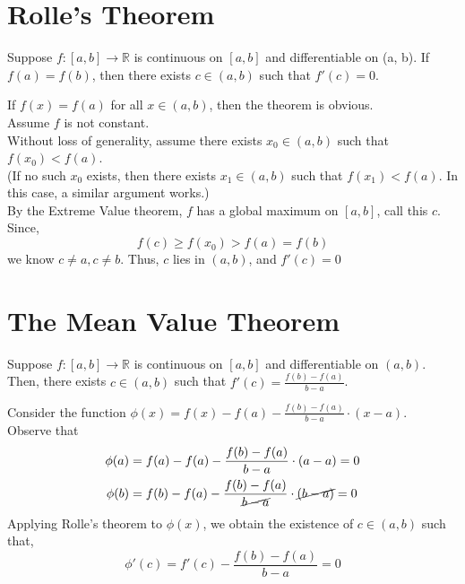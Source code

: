 \documentclass[12pt]{article}
\begin{document}
\section{Rolle's Theorem}
\begin{theo}{}
    Suppose $f: [a, b] \rightarrow \mathbb R$ is continuous on $[a, b]$ and differentiable on (a, b). If $f(a) = f(b)$, then there exists $c \in (a, b)$ such that $f'(c) = 0$.\\
\end{theo}
\begin{prf}{}
    If $f(x) = f(a)$ for all $x \in (a, b)$, then the theorem is obvious. \\Assume $f$ is not constant.\\ Without loss of generality, assume there exists $x_0 \in (a, b)$ such that $f(x_0) < f(a)$. \\(If no such $x_0$ exists, then there exists $x_1 \in (a, b)$ such that $f(x_1) < f(a)$. In this case, a similar argument works.)\\
    By the Extreme Value theorem, $f$ has a global maximum on $[a, b]$, call this $c$. Since,\\ $$f(c) \ge f(x_0) > f(a) = f(b)$$ we know $c \neq a, c \neq b$. Thus, $c$ lies in $(a, b)$, and $f'(c) = 0$
\end{prf}

\section{The Mean Value Theorem}
\begin{theo}{}
    Suppose $f: [a, b] \rightarrow \mathbb R$ is continuous on $[a, b]$ and differentiable on $(a, b)$. Then, there exists $c \in (a, b)$ such that $f'(c) = \frac{f(b) - f(a)}{b- a}$.
\end{theo}
\begin{prf}{}
    Consider the function $\phi(x) = f(x) - f(a) - \frac{f(b) - f(a)}{b - a}\cdot (x - a)$.\\ Observe that\\
\begin{align*}
    \phi(a) &= f(a) - f(a) - \frac{f(b) - f(a)}{b - a}\cdot (a - a) = 0\\
    \phi(b) &= f(b) - f(a) - \frac{f(b) - f(a)}{\cancel{b - a}}\cdot \cancel{(b - a)} = 0
\end{align*}
Applying Rolle's theorem to $\phi(x)$, we obtain the existence of $c \in (a, b)$ such that, \\
  $$\phi'(c) = f'(c) - \frac{f(b) - f(a)}{b - a} = 0$$  
\end{prf}
\end{document}
